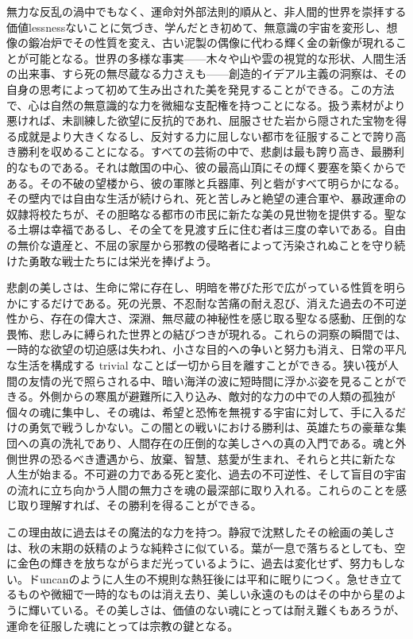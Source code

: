 \documentclass[a4paper,11pt,openany]{ltjsbook}
\begin{document}
無力な反乱の渦中でもなく、運命対外部法則的順从と、非人間的世界を崇拝する価値lessnessないことに気づき、学んだとき初めて、無意識の宇宙を変形し、想像の鍛冶炉でその性質を変え、古い泥製の偶像に代わる輝く金の新像が現れることが可能となる。世界の多様な事実——木々や山や雲の視覚的な形状、人間生活の出来事、すら死の無尽蔵なる力さえも——創造的イデアル主義の洞察は、その自身の思考によって初めて生み出された美を発見することができる。この方法で、心は自然の無意識的な力を微細な支配権を持つことになる。扱う素材がより悪ければ、未訓練した欲望に反抗的であれ、屈服させた岩から隠された宝物を得る成就是より大きくなるし、反対する力に屈しない都市を征服することで誇り高き勝利を収めることになる。すべての芸術の中で、悲劇は最も誇り高き、最勝利的なものである。それは敵国の中心、彼の最高山頂にその輝く要塞を築くからである。その不破の望楼から、彼の軍隊と兵器庫、列と砦がすべて明らかになる。その壁内では自由な生活が続けられ、死と苦しみと絶望の連合軍や、暴政運命の奴隷将校たちが、その胆略なる都市の市民に新たな美の見世物を提供する。聖なる土塀は幸福であるし、その全てを見渡す丘に住む者は三度の幸いである。自由の無价な遺産と、不屈の家屋から邪教の侵略者によって汚染されぬことを守り続けた勇敢な戦士たちには栄光を捧げよう。

悲劇の美しさは、生命に常に存在し、明暗を帯びた形で広がっている性質を明らかにするだけである。死の光景、不忍耐な苦痛の耐え忍び、消えた過去の不可逆性から、存在の偉大さ、深淵、無尽蔵の神秘性を感じ取る聖なる感動、圧倒的な畏怖、悲しみに縛られた世界との結びつきが現れる。これらの洞察の瞬間では、一時的な欲望の切迫感は失われ、小さな目的への争いと努力も消え、日常の平凡な生活を構成する trivial なことば一切から目を離すことができる。狭い筏が人間の友情の光で照らされる中、暗い海洋の波に短時間に浮かぶ姿を見ることができる。外側からの寒風が避難所に入り込み、敵対的な力の中での人類の孤独が個々の魂に集中し、その魂は、希望と恐怖を無視する宇宙に対して、手に入るだけの勇気で戦うしかない。この闇との戦いにおける勝利は、英雄たちの豪華な集団への真の洗礼であり、人間存在の圧倒的な美しさへの真の入門である。魂と外側世界の恐るべき遭遇から、放棄、智慧、慈愛が生まれ、それらと共に新たな人生が始まる。不可避の力である死と変化、過去の不可逆性、そして盲目の宇宙の流れに立ち向かう人間の無力さを魂の最深部に取り入れる。これらのことを感じ取り理解すれば、その勝利を得ることができる。

この理由故に過去はその魔法的な力を持つ。静寂で沈黙したその絵画の美しさは、秋の末期の妖精のような純粋さに似ている。葉が一息で落ちるとしても、空に金色の輝きを放ちながらまだ光っているように、過去は変化せず、努力もしない。ドuncanのように人生の不規則な熱狂後には平和に眠りにつく。急せき立てるものや微細で一時的なものは消え去り、美しい永遠のものはその中から星のように輝いている。その美しさは、価値のない魂にとっては耐え難くもあろうが、運命を征服した魂にとっては宗教の鍵となる。
\end{document}
